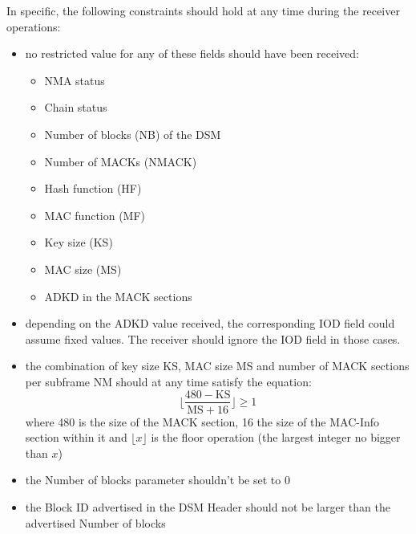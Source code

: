In specific, the following constraints should hold at any time during the
receiver operations:
\begin{itemize}
  \item no restricted value for any of these fields should have been received:
    \begin{itemize}
      \item \textrm{NMA status}
      \item \textrm{Chain status}
      \item \textrm{Number of blocks (NB)} of the DSM
      \item \textrm{Number of MACKs (NMACK)}
      \item \textrm{Hash function (HF)}
      \item \textrm{MAC function (MF)}
      \item \textrm{Key size (KS)}
      \item \textrm{MAC size (MS)}
      \item \textrm{ADKD} in the MACK sections
    \end{itemize}
  \item depending on the ADKD value received, the corresponding IOD field could
    assume fixed values. The receiver should ignore the IOD field in those cases.
  \item the combination of key size \textrm{KS}, MAC size \textrm{MS} and number
    of MACK sections per subframe \textrm{NM} should at any time satisfy the
    equation:
    \[
      \Big\lfloor \frac{480 - \textrm{KS}}{\textrm{MS} + 16} \Big\rfloor \geq 1
    \]
    where \num{480} is the size of the MACK section, \num{16} the size of the
    MAC-Info section within it and $\lfloor x \rfloor$ is the floor
    operation (the largest integer no bigger than $x$)
  \item the \textrm{Number of blocks} parameter shouldn't be set to \num{0}
  \item the \textrm{Block ID} advertised in the DSM Header should not be larger
    than the advertised \textrm{Number of blocks}
\end{itemize}



